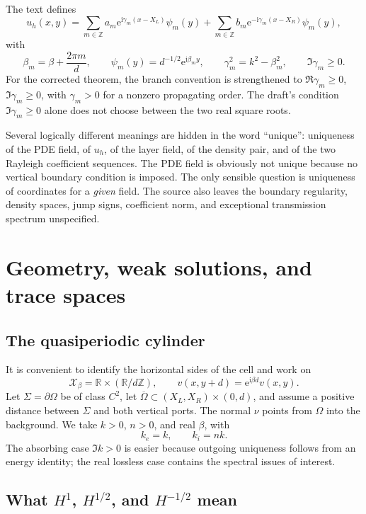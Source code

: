 \documentclass[11pt]{article}
\newcommand{\Om}{\Omega}
\newcommand{\Sig}{\Sigma}
\newcommand{\R}{\mathbb R}
\newcommand{\Z}{\mathbb Z}
\newcommand{\ii}{\mathrm i}
\newcommand{\ee}{\mathrm e}
\theoremstyle{plain}
\theoremstyle{definition}
\theoremstyle{remark}
\begin{document}
The text defines
\begin{equation}
u_h(x,y)=\sum_{m\in\Z}a_m\ee^{\ii\gamma_m(x-X_L)}\psi_m(y)
+\sum_{m\in\Z}b_m\ee^{-\ii\gamma_m(x-X_R)}\psi_m(y),
\label{eq:uh}
\end{equation}
with
\begin{equation}
\beta_m=\beta+\frac{2\pi m}{d},\qquad
\psi_m(y)=d^{-1/2}\ee^{\ii\beta_my},\qquad
\gamma_m^2=k^2-\beta_m^2,\qquad \Im\gamma_m\geq0.
\label{eq:modes}
\end{equation}
For the corrected theorem, the branch convention is strengthened to
\(\Re\gamma_m\geq0\), \(\Im\gamma_m\geq0\), with \(\gamma_m>0\) for a
nonzero propagating order.  The draft's condition \(\Im\gamma_m\geq0\) alone
does not choose between the two real square roots.

Several logically different meanings are hidden in the word ``unique'':
uniqueness of the PDE field, of \(u_h\), of the layer field, of the density
pair, and of the two Rayleigh coefficient sequences.  The PDE field is
obviously not unique because no vertical boundary condition is imposed.  The
only sensible question is uniqueness of coordinates for a \emph{given} field.
The source also leaves the boundary regularity, density spaces, jump signs,
coefficient norm, and exceptional transmission spectrum unspecified.

\section{Geometry, weak solutions, and trace spaces}
\label{sec:spaces}

\subsection{The quasiperiodic cylinder}

It is convenient to identify the horizontal sides of the cell and work on
\[
\mathscr X_\beta=\R\times(\R/d\Z),\qquad
v(x,y+d)=\ee^{\ii\beta d}v(x,y).
\]
Let \(\Sig=\partial\Om\) be of class \(C^2\), let
\(\overline\Om\subset(X_L,X_R)\times(0,d)\), and assume a positive distance
between \(\Sig\) and both vertical ports.  The normal \(\nu\) points from
\(\Om\) into the background.  We take \(k>0\), \(n>0\), and real \(\beta\),
with
\[
k_e=k,\qquad k_i=nk.
\]
The absorbing case \(\Im k>0\) is easier because outgoing uniqueness follows
from an energy identity; the real lossless case contains the spectral issues
of interest.

\subsection{What \texorpdfstring{\(H^1\), \(H^{1/2}\), and \(H^{-1/2}\)}{H1, H1/2, and H-1/2} mean}
\end{document}
